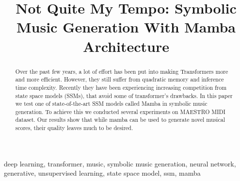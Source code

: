 \documentclass[conference]{IEEEtran}
\begin{document}
\title{Not Quite My Tempo: Symbolic Music Generation With Mamba Architecture}

\author{
    \and
    \and
}

\maketitle

\begin{abstract}
    Over the past few years, a lot of effort has been put into making Transformers more and more efficient. However, they still suffer from quadratic memory and inference time complexity. Recently they have been experiencing increasing competition from state space models (SSMs), that avoid some of transformer's drawbacks. In this paper we test one of state-of-the-art SSM models called Mamba in symbolic music generation. To achieve this we conducted several experiments on MAESTRO MIDI dataset. Our results show that while mamba can be used to generate novel musical scores, their quality leaves much to be desired.
\end{abstract}

\begin{IEEEkeywords}
    deep learning, transformer, music, symbolic music generation, neural network, generative, unsupervised learning, state space model, ssm, mamba
\end{IEEEkeywords}
\end{document}
